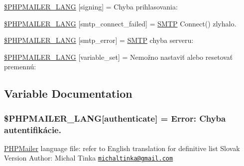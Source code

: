 \begin{DoxyCompactItemize}
\hyperlink{phpmailer_8lang-sk_8php_a68e437bdb9b968a5a67320f03d231565}{\$\+P\+H\+P\+M\+A\+I\+L\+E\+R\+\_\+\+L\+A\+NG} \mbox{[}\textquotesingle{}signing\textquotesingle{}\mbox{]} = \textquotesingle{}Chyba prihlasovania\+: \textquotesingle{}
\item 
\hyperlink{phpmailer_8lang-sk_8php_a7b321d4ca1e9df702403ed4c61aa0980}{\$\+P\+H\+P\+M\+A\+I\+L\+E\+R\+\_\+\+L\+A\+NG} \mbox{[}\textquotesingle{}smtp\+\_\+connect\+\_\+failed\textquotesingle{}\mbox{]} = \textquotesingle{}\hyperlink{class_s_m_t_p}{S\+M\+TP} Connect() zlyhalo.\textquotesingle{}
\item 
\hyperlink{phpmailer_8lang-sk_8php_a7d9cffba1e669c845f8a4c891ee50064}{\$\+P\+H\+P\+M\+A\+I\+L\+E\+R\+\_\+\+L\+A\+NG} \mbox{[}\textquotesingle{}smtp\+\_\+error\textquotesingle{}\mbox{]} = \textquotesingle{}\hyperlink{class_s_m_t_p}{S\+M\+TP} chyba serveru\+: \textquotesingle{}
\item 
\hyperlink{phpmailer_8lang-sk_8php_af795debc7a739d038742691c358d9032}{\$\+P\+H\+P\+M\+A\+I\+L\+E\+R\+\_\+\+L\+A\+NG} \mbox{[}\textquotesingle{}variable\+\_\+set\textquotesingle{}\mbox{]} = \textquotesingle{}Nemožno nastaviť alebo resetovať premennú\+: \textquotesingle{}
\end{DoxyCompactItemize}


\subsection{Variable Documentation}
\subsubsection[{\texorpdfstring{\$\+P\+H\+P\+M\+A\+I\+L\+E\+R\+\_\+\+L\+A\+NG}{$PHPMAILER_LANG}}]{\setlength{\rightskip}{0pt plus 5cm}\$P\+H\+P\+M\+A\+I\+L\+E\+R\+\_\+\+L\+A\+NG\mbox{[}\textquotesingle{}authenticate\textquotesingle{}\mbox{]} =  Error\+: Chyba autentifikácie.\textquotesingle{}}\hypertarget{phpmailer_8lang-sk_8php_a2cb33073c989b85580748e331ed8b4aa}{}\label{phpmailer_8lang-sk_8php_a2cb33073c989b85580748e331ed8b4aa}
\hyperlink{class_p_h_p_mailer}{P\+H\+P\+Mailer} language file\+: refer to English translation for definitive list Slovak Version Author\+: Michal Tinka \href{mailto:michaltinka@gmail.com}{\tt michaltinka@gmail.\+com} 

